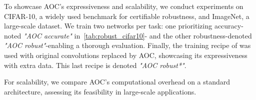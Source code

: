 To showcase AOC's expressiveness and scalability, we conduct experiments on CIFAR-10, a widely used benchmark for certifiable robustness, and ImageNet, a large-scale dataset. 
We train two networks per task: one prioritizing accuracy-noted \textit{"AOC accurate"} in~\cref{tab:robust_cifar10}- and the other robustness-denoted \textit{"AOC robust"}-enabling a thorough evaluation. Finally, the training recipe of \cite{hu_recipe_2023} was used with original convolutions replaced by AOC, showcasing its expressiveness with extra data. This last recipe is denoted \textit{"AOC robust*"}.

For scalability, we compare AOC's computational overhead on a standard architecture, assessing its feasibility in large-scale applications.

